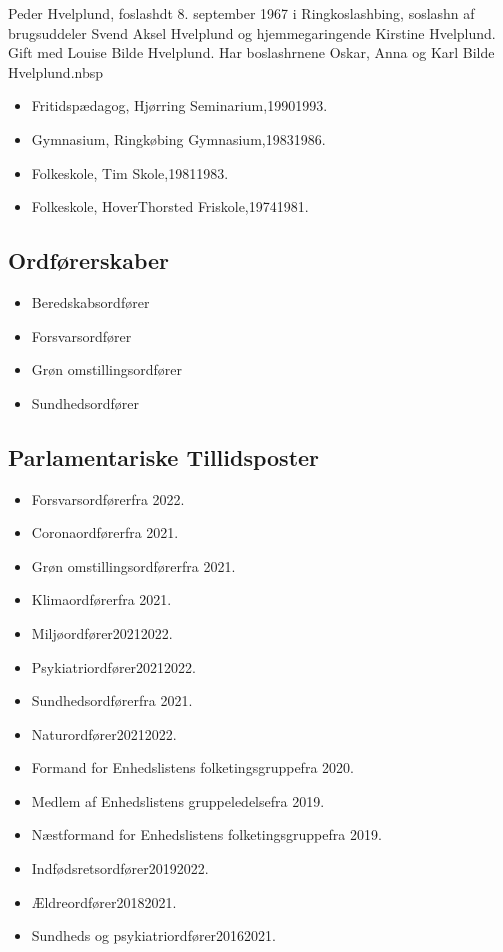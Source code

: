 \documentclass[11pt, a4paper]{awesome-cv}
\begin{document}
\makecvheader[R]
\makelettertitle
\begin{cvletter}
Peder Hvelplund, foslashdt 8. september 1967 i Ringkoslashbing, soslashn af brugsuddeler Svend Aksel Hvelplund og hjemmegaringende Kirstine Hvelplund. Gift med Louise Bilde Hvelplund. Har boslashrnene Oskar, Anna og Karl Bilde Hvelplund.nbsp

\begin{itemize}
\item Fritidspædagog, Hjørring Seminarium,19901993.
\item Gymnasium, Ringkøbing Gymnasium,19831986.
\item Folkeskole, Tim Skole,19811983.
\item Folkeskole, HoverThorsted Friskole,19741981.
\end{itemize}
\subsection*{Ordførerskaber}
\begin{itemize}
\item Beredskabsordfører
\item Forsvarsordfører
\item Grøn omstillingsordfører
\item Sundhedsordfører
\end{itemize}
\subsection*{Parlamentariske Tillidsposter}
\begin{itemize}
\item Forsvarsordførerfra 2022.
\item Coronaordførerfra 2021.
\item Grøn omstillingsordførerfra 2021.
\item Klimaordførerfra 2021.
\item Miljøordfører20212022.
\item Psykiatriordfører20212022.
\item Sundhedsordførerfra 2021.
\item Naturordfører20212022.
\item Formand for Enhedslistens folketingsgruppefra 2020.
\item Medlem af Enhedslistens gruppeledelsefra 2019.
\item Næstformand for Enhedslistens folketingsgruppefra 2019.
\item Indfødsretsordfører20192022.
\item Ældreordfører20182021.
\item Sundheds og psykiatriordfører20162021.
\end{itemize}

\end{cvletter}
\end{document}
